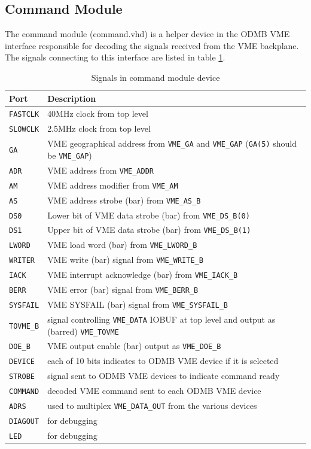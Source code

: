 \documentclass[10pt,a4paper]{article}
\begin{document}
\subsection{Command Module}

The command module (command.vhd) is a helper device in the ODMB VME interface responsible for decoding the signals received from the VME backplane. The signals connecting to this interface are listed in table \ref{tab:commandinterface}.

\begin{table}[H]
\begin{tabular}{|l|l|} \hline
Port& Description\\ \hline
\texttt{FASTCLK}& 40MHz clock from top level\\ \hline
\texttt{SLOWCLK}& 2.5MHz clock from top level\\ \hline
\texttt{GA}& VME geographical address from \texttt{VME\_GA} and \texttt{VME\_GAP} (\texttt{GA(5)} should be \texttt{VME\_GAP})\\ \hline
\texttt{ADR}& VME address from \texttt{VME\_ADDR}\\ \hline
\texttt{AM}& VME address modifier from \texttt{VME\_AM}\\ \hline
\texttt{AS}& VME address strobe (bar) from \texttt{VME\_AS\_B}\\ \hline
\texttt{DS0}& Lower bit of VME data strobe (bar) from \texttt{VME\_DS\_B(0)}\\ \hline
\texttt{DS1}& Upper bit of VME data strobe (bar) from \texttt{VME\_DS\_B(1)}\\ \hline
\texttt{LWORD}& VME load word (bar) from \texttt{VME\_LWORD\_B}\\ \hline
\texttt{WRITER}& VME write (bar) signal from \texttt{VME\_WRITE\_B}\\ \hline
\texttt{IACK}& VME interrupt acknowledge (bar) from \texttt{VME\_IACK\_B}\\ \hline
\texttt{BERR}& VME error (bar) signal from \texttt{VME\_BERR\_B}\\ \hline
\texttt{SYSFAIL}& VME SYSFAIL (bar) signal from \texttt{VME\_SYSFAIL\_B}\\ \hline
\texttt{TOVME\_B}& signal controlling \texttt{VME\_DATA} IOBUF at top level and output as (barred) \texttt{VME\_TOVME}\\ \hline
\texttt{DOE\_B}& VME output enable (bar) output as \texttt{VME\_DOE\_B}\\ \hline
\texttt{DEVICE}& each of 10 bits indicates to ODMB VME device if it is selected\\ \hline
\texttt{STROBE}& signal sent to ODMB VME devices to indicate command ready\\ \hline
\texttt{COMMAND}& decoded VME command sent to each ODMB VME device\\ \hline
\texttt{ADRS}& used to multiplex \texttt{VME\_DATA\_OUT} from the various devices\\ \hline
\texttt{DIAGOUT}& for debugging\\ \hline
\texttt{LED}& for debugging\\ \hline
\end{tabular}
\caption{Signals in command module device}
\label{tab:commandinterface}
\end{table}
\end{document}
